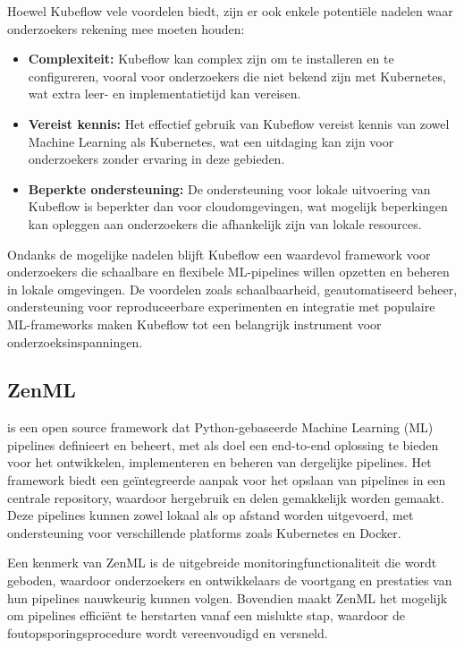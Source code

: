 Hoewel Kubeflow vele voordelen biedt, zijn er ook enkele potentiële nadelen waar onderzoekers rekening mee moeten houden:
\begin{itemize}
    \item \textbf{Complexiteit:} Kubeflow kan complex zijn om te installeren en te configureren, vooral voor onderzoekers die niet bekend zijn met Kubernetes, wat extra leer- en implementatietijd kan vereisen.
    \item \textbf{Vereist kennis:} Het effectief gebruik van Kubeflow vereist kennis van zowel Machine Learning als Kubernetes, wat een uitdaging kan zijn voor onderzoekers zonder ervaring in deze gebieden.
    \item \textbf{Beperkte ondersteuning:} De ondersteuning voor lokale uitvoering van Kubeflow is beperkter dan voor cloudomgevingen, wat mogelijk beperkingen kan opleggen aan onderzoekers die afhankelijk zijn van lokale resources.
\end{itemize}

Ondanks de mogelijke nadelen blijft Kubeflow een waardevol framework voor onderzoekers die schaalbare en flexibele ML-pipelines willen opzetten en beheren in lokale omgevingen. De voordelen zoals schaalbaarheid, geautomatiseerd beheer, ondersteuning voor reproduceerbare experimenten en integratie met populaire ML-frameworks maken Kubeflow tot een belangrijk instrument voor onderzoeksinspanningen.

\subsection{ZenML}

\textcite{ZenML2024} is een open source framework dat Python-gebaseerde Machine Learning (ML) pipelines definieert en beheert, met als doel een end-to-end oplossing te bieden voor het ontwikkelen, implementeren en beheren van dergelijke pipelines. Het framework biedt een geïntegreerde aanpak voor het opslaan van pipelines in een centrale repository, waardoor hergebruik en delen gemakkelijk worden gemaakt. Deze pipelines kunnen zowel lokaal als op afstand worden uitgevoerd, met ondersteuning voor verschillende platforms zoals Kubernetes en Docker.

Een kenmerk van ZenML is de uitgebreide monitoringfunctionaliteit die wordt geboden, waardoor onderzoekers en ontwikkelaars de voortgang en prestaties van hun pipelines nauwkeurig kunnen volgen. Bovendien maakt ZenML het mogelijk om pipelines efficiënt te herstarten vanaf een mislukte stap, waardoor de foutopsporingsprocedure wordt vereenvoudigd en versneld.

